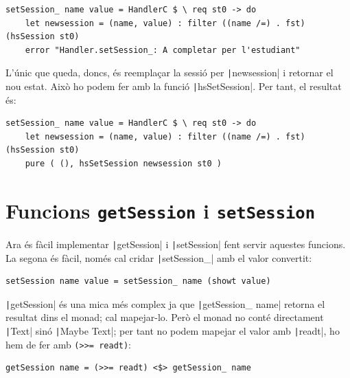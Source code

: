 \documentclass[catalan, a4paper]{scrartcl}
\newcommand{\haskellfunc}[2]{\texorpdfstring{\texttt{#1}}{#2}}
\begin{document}
\begin{verbatim}
setSession_ name value = HandlerC $ \ req st0 -> do
    let newsession = (name, value) : filter ((name /=) . fst) (hsSession st0)
    error "Handler.setSession_: A completar per l'estudiant"
\end{verbatim}

L'únic que queda, doncs, és reemplaçar la sessió per \texttt|newsession|
i retornar el nou estat. Això ho podem fer amb la funció \texttt|hsSetSession|.
Per tant, el resultat és:

\begin{verbatim}
setSession_ name value = HandlerC $ \ req st0 -> do
    let newsession = (name, value) : filter ((name /=) . fst) (hsSession st0)
    pure ( (), hsSetSession newsession st0 )
\end{verbatim}

\section{Funcions \haskellfunc{getSession}{getSession} i \haskellfunc{setSession}{setSession}}

Ara és fàcil implementar \texttt|getSession| i \texttt|setSession|
fent servir aquestes funcions. La segona és fàcil, només cal cridar \texttt|setSession_|
amb el valor convertit:

\begin{verbatim}
setSession name value = setSession_ name (showt value)
\end{verbatim}

\texttt|getSession| és una mica més complex ja que \texttt|getSession_ name|
retorna el resultat dins el monad; cal mapejar-lo. Però el monad no conté
directament \texttt|Text| sinó \texttt|Maybe Text|;
per tant no podem mapejar el valor amb \texttt|readt|, ho hem de fer amb \texttt{(>>= readt)}:

\begin{verbatim}
getSession name = (>>= readt) <$> getSession_ name
\end{verbatim}
\end{document}
